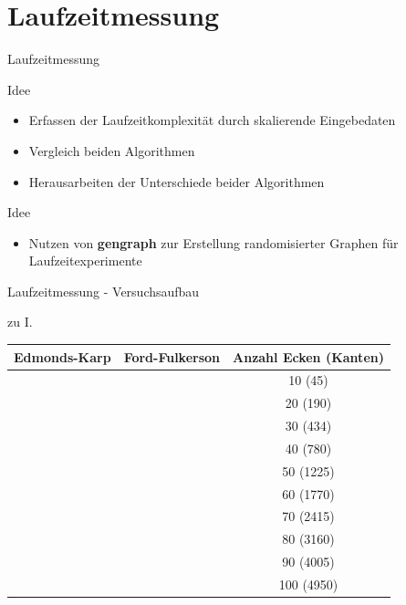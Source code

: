 \documentclass{beamer}
\begin{document}
    \section{Laufzeitmessung}
    \begin{frame}{Laufzeitmessung}
        \begin{block}{Idee}
            \begin{itemize}
                \item[I.] Erfassen der Laufzeitkomplexit\"at durch skalierende Eingebedaten
                \item[II.] Vergleich beiden Algorithmen
                \item[III.] Herausarbeiten der Unterschiede beider Algorithmen
            \end{itemize}
        \end{block}

        \begin{block}{Idee}
            \begin{itemize}
                \item Nutzen von \textbf{gengraph} zur Erstellung randomisierter Graphen f\"ur Laufzeitexperimente
            \end{itemize}
        \end{block}
    \end{frame}

    \begin{frame}{Laufzeitmessung - Versuchsaufbau}
        \begin{block}{zu I.}
            \begin{center}
                \begin{tabular}{c|c|c}
                    \textbf{Edmonds-Karp} & \textbf{Ford-Fulkerson} & Anzahl Ecken (Kanten)\\
                    \hline
                    & & 10 (45)\\
                    & & 20 (190)\\
                    & & 30 (434)\\
                    & & 40 (780)\\
                    & & 50 (1225)\\
                    & & 60 (1770)\\
                    & & 70 (2415)\\
                    & & 80 (3160)\\
                    & & 90 (4005)\\
                    & & 100 (4950)\\
                \end{tabular}
            \end{center}
        \end{block}
    \end{frame}
\end{document}
